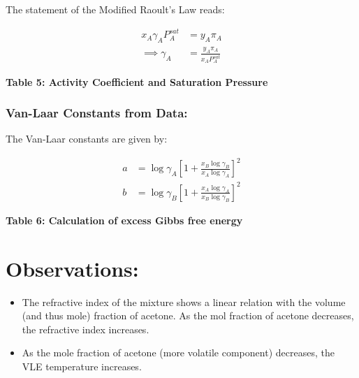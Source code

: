 \documentclass[11pt]{article}
\providecommand{\tightlist}{%
      \setlength{\itemsep}{0pt}\setlength{\parskip}{0pt}}
\begin{document}
The statement of the Modified Raoult's Law reads:

\begin{equation}
  \begin{split}
    x_A\gamma_AP_A^{sat}&=y_A\pi_A\\
    \implies \gamma_A&=\frac{y_A\pi_A}{x_AP_A^{sat}}
  \end{split}
\end{equation}

\textbf{Table 5: Activity Coefficient and Saturation Pressure}

\begin{center}
\end{center}

\hypertarget{van-laar-constants-from-data}{%
  \subsubsection{Van-Laar Constants from
    Data:}\label{van-laar-constants-from-data}}

The Van-Laar constants are given by:

\begin{equation}
  \begin{split}
    a&=\log{\gamma_A}\left[1+\frac{x_B\log{\gamma_B}}{x_A\log{\gamma_A}}\right]^2\\
    b&=\log{\gamma_B}\left[1+\frac{x_A\log{\gamma_A}}{x_B\log{\gamma_B}}\right]^2
  \end{split}
\end{equation}

\textbf{Table 6: Calculation of excess Gibbs free energy}

\begin{center}
\end{center}
\pagebreak

\hypertarget{observations}{%
  \section{Observations:}\label{observations}}

\begin{itemize}
  \tightlist
  \item
        The refractive index of the mixture shows a linear relation with the
        volume (and thus mole) fraction of acetone. As the mol fraction of
        acetone decreases, the refractive index increases.
  \item
        As the mole fraction of acetone (more volatile component) decreases,
        the VLE temperature increases.
\end{itemize}
\end{document}
